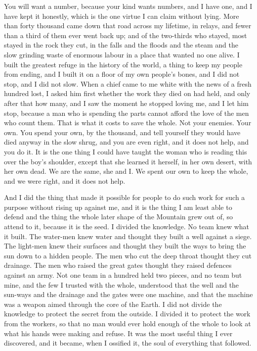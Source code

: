 You will want a number, because your kind wants numbers, and I have one, and I have kept it honestly, which is the one virtue I can claim without lying. More than forty thousand came down that road across my lifetime, in relays, and fewer than a third of them ever went back up; and of the two-thirds who stayed, most stayed in the rock they cut, in the falls and the floods and the steam and the slow grinding waste of enormous labour in a place that wanted no one alive. I built the greatest refuge in the history of the world, a thing to keep my people from ending, and I built it on a floor of my own people's bones, and I did not stop, and I did not slow. When a chief came to me white with the news of a fresh hundred lost, I asked him first whether the work they died on had held, and only after that how many, and I saw the moment he stopped loving me, and I let him stop, because a man who is spending the parts cannot afford the love of the men who count them. That is what it costs to save the whole. Not your enemies. Your own. You spend your own, by the thousand, and tell yourself they would have died anyway in the slow shrug, and you are even right, and it does not help, and you do it. It is the one thing I could have taught the woman who is reading this over the boy's shoulder, except that she learned it herself, in her own desert, with her own dead. We are the same, she and I. We spent our own to keep the whole, and we were right, and it does not help.\par

And I did the thing that made it possible for people to do such work for such a purpose without rising up against me, and it is the thing I am least able to defend and the thing the whole later shape of the Mountain grew out of, so attend to it, because it is the seed. I divided the knowledge. No team knew what it built. The water-men knew water and thought they built a well against a siege. The light-men knew their surfaces and thought they built the ways to bring the sun down to a hidden people. The men who cut the deep throat thought they cut drainage. The men who raised the great gates thought they raised defences against an army. Not one team in a hundred held two pieces, and no team but mine, and the few I trusted with the whole, understood that the well and the sun-ways and the drainage and the gates were one machine, and that the machine was a weapon aimed through the core of the Earth. I did not divide the knowledge to protect the secret from the outside. I divided it to protect the work from the workers, so that no man would ever hold enough of the whole to look at what his hands were making and refuse. It was the most useful thing I ever discovered, and it became, when I ossified it, the soul of everything that followed.\par

